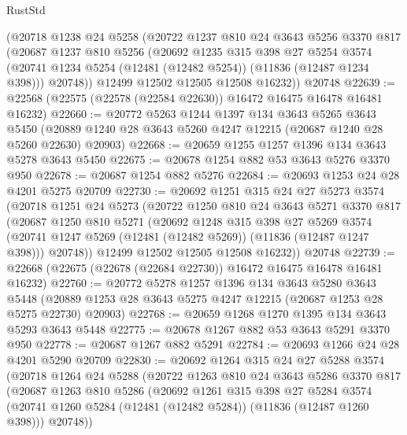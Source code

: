 \begin{lexlean}{RustStd}
\begin{coremodule}
    (@20718
      @1238
      @24
      @5258
      (@20722
        @1237
        @810
        @24
        @3643
        @5256
        @3370
        @817
        (@20687
          @1237
          @810
          @5256
          (@20692
            @1235
            @315
            @398
            @27
            @5254
            @3574
            (@20741 @1234 @5254 (@12481 (@12482 @5254)) (@11836 (@12487 @1234 @398)))
            @20748))
        @12499
        @12502
        @12505
        @12508
        @16232))
    @20748
@22639 := @22568 (@22575 (@22578 (@22584 @22630)) @16472 @16475 @16478 @16481 @16232)
@22660 := @20772
    @5263
    @1244
    @1397
    @134
    @3643
    @5265
    @3643
    @5450
    (@20889 @1240 @28 @3643 @5260 @4247 @12215 (@20687 @1240 @28 @5260 @22630) @20903)
@22668 := @20659 @1255 @1257 @1396 @134 @3643 @5278 @3643 @5450
@22675 := @20678 @1254 @882 @53 @3643 @5276 @3370 @950
@22678 := @20687 @1254 @882 @5276
@22684 := @20693 @1253 @24 @28 @4201 @5275 @20709
@22730 := @20692
    @1251
    @315
    @24
    @27
    @5273
    @3574
    (@20718
      @1251
      @24
      @5273
      (@20722
        @1250
        @810
        @24
        @3643
        @5271
        @3370
        @817
        (@20687
          @1250
          @810
          @5271
          (@20692
            @1248
            @315
            @398
            @27
            @5269
            @3574
            (@20741 @1247 @5269 (@12481 (@12482 @5269)) (@11836 (@12487 @1247 @398)))
            @20748))
        @12499
        @12502
        @12505
        @12508
        @16232))
    @20748
@22739 := @22668 (@22675 (@22678 (@22684 @22730)) @16472 @16475 @16478 @16481 @16232)
@22760 := @20772
    @5278
    @1257
    @1396
    @134
    @3643
    @5280
    @3643
    @5448
    (@20889 @1253 @28 @3643 @5275 @4247 @12215 (@20687 @1253 @28 @5275 @22730) @20903)
@22768 := @20659 @1268 @1270 @1395 @134 @3643 @5293 @3643 @5448
@22775 := @20678 @1267 @882 @53 @3643 @5291 @3370 @950
@22778 := @20687 @1267 @882 @5291
@22784 := @20693 @1266 @24 @28 @4201 @5290 @20709
@22830 := @20692
    @1264
    @315
    @24
    @27
    @5288
    @3574
    (@20718
      @1264
      @24
      @5288
      (@20722
        @1263
        @810
        @24
        @3643
        @5286
        @3370
        @817
        (@20687
          @1263
          @810
          @5286
          (@20692
            @1261
            @315
            @398
            @27
            @5284
            @3574
            (@20741 @1260 @5284 (@12481 (@12482 @5284)) (@11836 (@12487 @1260 @398)))
            @20748))

\end{coremodule}
\end{lexlean}
